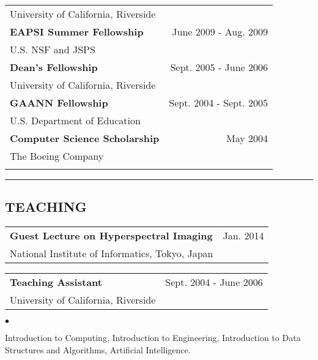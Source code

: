 \documentclass[letterpaper,10pt]{article}
\newcommand{\myline}{ \rule{\textwidth}{0.01in} }
\newenvironment{smallitemize}{
  \begin{list}{$\bullet$}{
    \setlength{\leftmargin}{3.5em}
        \setlength{\topmargin}{-1.0em}
    \setlength{\itemsep}{-0.10em}
    \setlength{\parskip}{-0.8em}
    \setlength{\parsep}{0.10em}
  }
}{
  \end{list}
}
\renewcommand{\bf}{\bfseries}
\begin{document}
\begin{tabularx}{\textwidth}{b{}r}
        {University of California, Riverside} & {} \\ \vspace{0.05in}
\bfseries{EAPSI Summer Fellowship} & {June 2009 - Aug. 2009} \\
        {U.S. NSF and JSPS} & {} \\ \vspace{0.05in}
\bfseries{Dean's Fellowship} & {Sept. 2005 - June 2006} \\
        {University of California, Riverside} & {} \\ \vspace{0.05in}
\bfseries{GAANN Fellowship} & {Sept. 2004 - Sept. 2005} \\
        {U.S. Department of Education} & {} \\ \vspace{0.05in}
\bfseries{Computer Science Scholarship} & {May 2004} \\
        {The Boeing Company} & {} \\ \vspace{0.05in}
\end{tabularx}

\myline

\subsection*{TEACHING}
\begin{tabularx}{\textwidth}{b{}r}
        \bf{Guest Lecture on Hyperspectral Imaging} & Jan. 2014\\
        {National Institute of Informatics, Tokyo, Japan} &\\
\end{tabularx}

\begin{tabularx}{\textwidth}{b{}r}
        \bf{Teaching Assistant} & Sept. 2004 - June 2006\\
        {University of California, Riverside} &\\
\end{tabularx}
\begin{smallitemize} \normalfont
        \item Introduction to Computing, Introduction to Engineering, Introduction to Data Structures and Algorithms, Artificial Intelligence.
\end{smallitemize}
\end{document}
